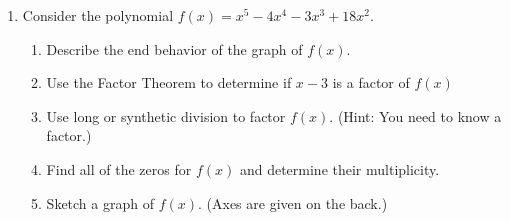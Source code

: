 \documentclass[11pt]{article}
\begin{document}
\begin{enumerate}
\begin{enumerate}
\end{enumerate}

\newpage

\item Consider the polynomial $f(x) = x^5 - 4x^4 - 3x^3+18x^2$.

\begin{enumerate}
	\item Describe the end behavior of the graph of $f(x)$.
	\vfill
	\item Use the Factor Theorem to determine if $x-3$ is a factor of $f(x)$
	\vfill
	\item Use long or synthetic division to factor $f(x)$.  (Hint: You need to know a factor.)
	\vfill
	\item Find all of the zeros for $f(x)$ and determine their multiplicity.
	\vfill
	\item Sketch a graph of $f(x)$. (Axes are given on the back.)
\end{enumerate}





\newpage

%
%
%
%
%

\newpage


\end{enumerate}
\end{document}
